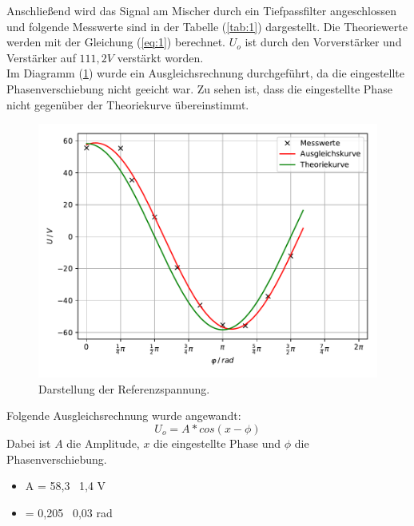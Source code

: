 Anschließend wird das Signal am Mischer durch ein Tiefpassfilter angeschlossen und folgende
Messwerte sind in der Tabelle (\ref{tab:1}) dargestellt.
Die Theoriewerte werden mit der Gleichung (\ref{eq:1}) berechnet.
$U_o$ ist durch den Vorverstärker und Verstärker auf $111,2 V$ verstärkt worden.\\
Im Diagramm (\ref{abb:5}) wurde ein Ausgleichsrechnung durchgeführt, da die eingestellte Phasenverschiebung
nicht geeicht war. Zu sehen ist, dass die eingestellte Phase nicht
gegenüber der Theoriekurve übereinstimmt.
\begin{figure}[H]
	\centering
	\includegraphics[width=\textwidth]{kurve1.pdf}
	\caption{Darstellung der Referenzspannung.}
	\label{abb:5}
\end{figure}
Folgende Ausgleichsrechnung wurde angewandt:
\begin{equation*}
	 U_o = A * cos(x - \phi)
 \end{equation*}
Dabei ist $A$ die Amplitude, $x$ die eingestellte Phase und $\phi$ die Phasenverschiebung.
\begin{itemize}
	\item A = 58,3 \pm \, 1,4 V
	\item \phi = 0,205 \pm \, 0,03 rad
\end{itemize}
